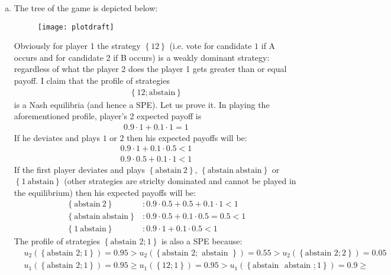\documentclass[a4paper]{article}
\begin{document}
\begin{enumerate}[(a)]
	\item The tree of the game is depicted below:
	\begin{figure}[H]
		\centering
		\texttt{[image: plotdraft]}
		\caption{}\label{fig2}
	\end{figure}
	Obviously for player 1 the strategy $\left\{12\right\}$ (i.e. vote for candidate $1$ if A occurs and for candidate 2 if B occurs) is a weakly dominant strategy: regardless of what the player 2 does the player 1 gets greater than or equal payoff. I claim that the profile of strategies 
	\begin{align*}
	\left\{12; \text{abstain}\right\}
	\end{align*}
	is a Nash equilibria (and hence a SPE). Let us prove it. In playing the aforementioned profile, player's 2 expected payoff is
	\begin{align*}
	0.9 \cdot 1 + 0.1 \cdot 1 = 1
	\end{align*}
	If he deviates and plays $1$ or $2$ then his expected payoffs will be:
	\begin{align*}
	0.9 \cdot 1 + 0.1 \cdot 0.5 < 1\\
	0.9 \cdot 0.5 + 0.1 \cdot 1 < 1
	\end{align*}
	If the first player deviates and plays $\left\{\text{abstain}\ 2\right\}$, $\left\{\text{abstain}\ \text{abstain}\right\}$ or $\left\{1\ \text{abstain}\right\}$ (other strategies are striclty dominated and cannot be played in the equilibrium) then his expected payoffs will be:
	\begin{align*}
	\left\{\text{abstain}\ 2\right\}&: 0.9 \cdot 0.5 + 0.5 + 0.1 \cdot 1 < 1\\
	\left\{\text{abstain}\ \text{abstain}\right\}&: 0.9 \cdot 0.5 + 0.1 \cdot 0.5 = 0.5 < 1\\
	\left\{1\ \text{abstain}\right\}&: 0.9 \cdot 1 + 0.1 \cdot 0.5 < 1
	\end{align*}
	The profile of strategies $\left\{\text{abstain } 2; 1 \right\}$ is also a SPE because:
	\begin{align*}
	&u_2(\left\{\text{abstain } 2; 1 \right\}) = 0.95 > u_2(\left\{\text{abstain } 2; \text{ abstain } \right\}) = 0.55 > u_2(\left\{\text{abstain } 2; 2 \right\}) = 0.05\\
	&u_1(\left\{\text{abstain } 2; 1 \right\}) = 0.95 \ge u_1(\left\{1 2; 1 \right\}) = 0.95 > u_1(\left\{\text{abstain } \text{ abstain }; 1 \right\}) = 0.9 \ge \\

\end{align*}
\end{enumerate}
\end{document}
